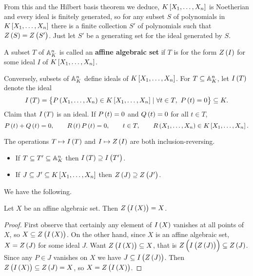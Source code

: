 From this and the Hilbert basis theorem we deduce, $ K\sbr{X_1, \dots, X_n} $ is Noetherian and every ideal is finitely generated, so for any subset $ S $ of polynomials in $ K\sbr{X_1, \dots, X_n} $ there is a finite collection $ S' $ of polynomials such that $ Z\br{S} = Z\br{S'} $. Just let $ S' $ be a generating set for the ideal generated by $ S $.

\begin{definition}
A subset $ T $ of $ \mathbb{A}_K^n $ is called an \textbf{affine algebraic set} if $ T $ is for the form $ Z\br{I} $ for some ideal $ I $ of $ K\sbr{X_1, \dots, X_n} $.
\end{definition}

Conversely, subsets of $ \mathbb{A}_K^n $ define ideals of $ K\sbr{X_1, \dots, X_n} $. For $ T \subseteq \mathbb{A}_K^n $, let $ I\br{T} $ denote the ideal
$$ I\br{T} = \cbr{P\br{X_1, \dots, X_n} \in K\sbr{X_1, \dots, X_n} \mid \forall t \in T, \ P\br{t} = 0} \subseteq K. $$
Claim that $ I\br{T} $ is an ideal. If $ P\br{t} = 0 $ and $ Q\br{t} = 0 $ for all $ t \in T $,
$$ P\br{t} + Q\br{t} = 0, \qquad R\br{t}P\br{t} = 0, \qquad t \in T, \qquad R\br{X_1, \dots, X_n} \in K\sbr{X_1, \dots, X_n}. $$

\begin{note*}
The operations $ T \mapsto I\br{T} $ and $ I \mapsto Z\br{I} $ are both inclusion-reversing.
\begin{itemize}
\item If $ T \subseteq T' \subseteq \mathbb{A}_K^n $ then $ I\br{T} \supseteq I\br{T'} $.
\item If $ J \subseteq J' \subseteq K\sbr{X_1, \dots, X_n} $ then $ Z\br{J} \supseteq Z\br{J'} $.
\end{itemize}
\end{note*}

We have the following.

\begin{lemma}
Let $ X $ be an affine algebraic set. Then $ Z\br{I\br{X}} = X $.
\end{lemma}

\begin{proof}
First observe that certainly any element of $ I\br{X} $ vanishes at all points of $ X $, so $ X \subseteq Z\br{I\br{X}} $. On the other hand, since $ X $ is an affine algebraic set, $ X = Z\br{J} $ for some ideal $ J $. Want $ Z\br{I\br{X}} \subseteq X $, that is $ Z\br{I\br{Z\br{J}}} \subseteq Z\br{J} $. Since any $ P \in J $ vanishes on $ X $ we have $ J \subseteq I\br{Z\br{J}} $. Then $ Z\br{I\br{X}} \subseteq Z\br{J} = X $, so $ X = Z\br{I\br{X}} $.
\end{proof}

